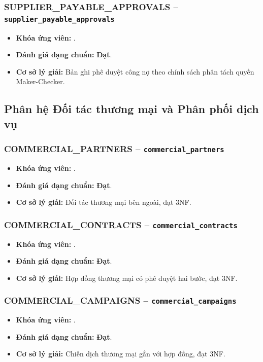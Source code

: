 \subsubsection{SUPPLIER_PAYABLE_APPROVALS -- \texttt{supplier\_payable\_approvals}}
\begin{itemize}
  \item \textbf{Khóa ứng viên:} \texttt{}.
  \item \textbf{Đánh giá dạng chuẩn:} \textbf{Đạt}.
  \item \textbf{Cơ sở lý giải:} Bản ghi phê duyệt công nợ theo chính sách phân tách quyền Maker-Checker.
\end{itemize}

\subsection{Phân hệ Đối tác thương mại và Phân phối dịch vụ}
\subsubsection{COMMERCIAL_PARTNERS -- \texttt{commercial\_partners}}
\begin{itemize}
  \item \textbf{Khóa ứng viên:} \texttt{}.
  \item \textbf{Đánh giá dạng chuẩn:} \textbf{Đạt}.
  \item \textbf{Cơ sở lý giải:} Đối tác thương mại bên ngoài, đạt 3NF.
\end{itemize}

\subsubsection{COMMERCIAL_CONTRACTS -- \texttt{commercial\_contracts}}
\begin{itemize}
  \item \textbf{Khóa ứng viên:} \texttt{}.
  \item \textbf{Đánh giá dạng chuẩn:} \textbf{Đạt}.
  \item \textbf{Cơ sở lý giải:} Hợp đồng thương mại có phê duyệt hai bước, đạt 3NF.
\end{itemize}

\subsubsection{COMMERCIAL_CAMPAIGNS -- \texttt{commercial\_campaigns}}
\begin{itemize}
  \item \textbf{Khóa ứng viên:} \texttt{}.
  \item \textbf{Đánh giá dạng chuẩn:} \textbf{Đạt}.
  \item \textbf{Cơ sở lý giải:} Chiến dịch thương mại gắn với hợp đồng, đạt 3NF.
\end{itemize}

